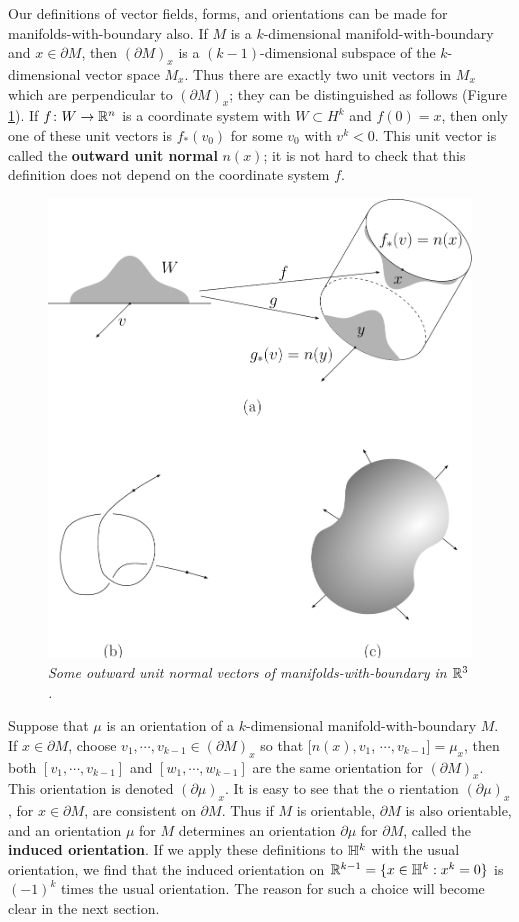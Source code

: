 Our definitions of vector fields, forms, and orientations can be made for 
manifolds-with-boundary also. If $M$ is a $k$-dimensional manifold-with-boundary 
and $x\in \partial M$, then $(\partial M)_x$ is a $(k-1)$-dimensional subspace of the 
$k$-dimensional vector space $M_x$. Thus there are exactly two unit vectors in $M_x$
which are perpendicular to $(\partial M)_x$; they can be distinguished as follows 
(Figure \ref{Fig 5-8}). If $f\colon{} W\to \mathbb{R}^n$ is a coordinate system with $W\subset {H}^k$ and 
$f(0) = x$, then only one of these unit vectors is $f_*(v_0)$ for some $v_0$ with $v^k < 0$.
This unit vector is called the \textbf{outward unit normal} $n(x)$; 
it is not hard to check that this definition does not depend on the coordinate system $f$.

\begin{figure}[!htb]
    \centering
    \includegraphics[width=.75\linewidth]{./pics/Fig5-8.pdf}
    \caption{\textit{Some outward unit normal vectors of manifolds-with-boundary in $\mathbb{R}^3$.}}
    \label{Fig 5-8}
\end{figure}

Suppose that $\mu$ is an orientation of a $k$-dimensional manifold-with-boundary $M$. If $x\in\partial M$,
choose $v_1,\cdots,v_{k-1}\in(\partial M)_x$ so that $[n(x), v_1$, $\cdots, v_{k-1}]=\mu_x$, then both 
$[v_1,\cdots,v_{k-1}]$ and $[w_1,\cdots,w_{k-1}]$ are the same orientation for $(\partial M)_x$. This 
orientation is denoted $(\partial\mu)_x$. It is easy to see that the o  rientation $(\partial\mu)_x$, for 
$x\in\partial M$, are consistent on $\partial M$. Thus if $M$ is orientable, $\partial M$ is also orientable,
and an orientation $\mu$ for $M$ determines an orientation $\partial\mu$ for $\partial M$, called the 
\textbf{induced orientation}. If we apply these definitions 
to $\mathbb{H}^k$ with the usual orientation, we find that the induced orientation on $\mathbb{R}^{k-1}=\{x\in\mathbb{H}^k:x^k=0\}$ is $(-1)^k$ times the usual orientation.
The reason for such a choice will become clear in the next section.

